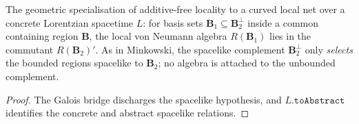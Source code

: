\begin{theorem}
    \label{thrm:additive-free-locality-in-curved-spacetime}
    \leanok
    The geometric specialisation of additive-free locality to a curved local net over a concrete Lorentzian spacetime $L$: for basis sets $\mathbf{B}_1 \subseteq \mathbf{B}_2^\perp$ inside a common containing region $\mathbf{B}$, the local von Neumann algebra $R(\mathbf{B}_1)$ lies in the commutant $R(\mathbf{B}_2)'$. As in Minkowski, the spacelike complement $\mathbf{B}_2^\perp$ only \emph{selects} the bounded regions spacelike to $\mathbf{B}_2$; no algebra is attached to the unbounded complement.
\end{theorem}
\begin{proof}
    \leanok
    The Galois bridge discharges the spacelike hypothesis, and $L.\mathtt{toAbstract}$ identifies the concrete and abstract spacelike relations.
\end{proof}

